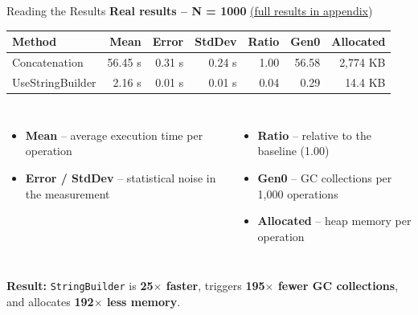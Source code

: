 \documentclass[aspectratio=1610, xcolor=table]{beamer}
\begin{document}
\begin{frame}{Reading the Results}
	\textbf{Real results -- N = 1000} {\small \textcolor{PrimaryAccent}{\hyperlink{full-results}{(full results in appendix})}}

	\vspace{0.8em}
	\begin{center}
		\small
		\begin{tabular}{l|r|r|r|r|r|r}
			\toprule
			\textbf{Method}  & \textbf{Mean}    & \textbf{Error}  & \textbf{StdDev} & \textbf{Ratio} & \textbf{Gen0} & \textbf{Allocated} \\
			\midrule
			Concatenation    & 56.45 \textmu{}s & 0.31 \textmu{}s & 0.24 \textmu{}s & 1.00           & 56.58         & 2,774 KB           \\
			UseStringBuilder & 2.16 \textmu{}s  & 0.01 \textmu{}s & 0.01 \textmu{}s & 0.04           & 0.29          & 14.4 KB            \\
			\bottomrule
		\end{tabular}
	\end{center}

	\vspace{1em}
	\begin{columns}[T]
		\begin{itemize}
			\item \textbf{Mean} -- average execution time per operation
			\item \textbf{Error / StdDev} -- statistical noise in the measurement
		\end{itemize}

		\begin{itemize}
			\item \textbf{Ratio} -- relative to the baseline (1.00)
			\item \textbf{Gen0} -- GC collections per 1,000 operations
			\item \textbf{Allocated} -- heap memory per operation
		\end{itemize}
	\end{columns}

	\vspace{0.8em}
	\textcolor{SecondaryAccent}{\textbf{Result:}}
	\texttt{StringBuilder} is \textbf{25$\times$ faster}, triggers \textbf{195$\times$ fewer GC collections}, and allocates \textbf{192$\times$ less memory}.
\end{frame}
\end{document}
